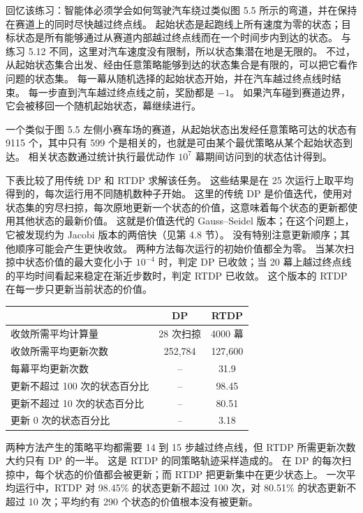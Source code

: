 \documentclass[UTF8,12pt,a4paper,fontset=fandol]{ctexart}
\begin{document}
回忆该练习：智能体必须学会如何驾驶汽车绕过类似图 5.5 所示的弯道，并在保持在赛道上的同时尽快越过终点线。
起始状态是起跑线上所有速度为零的状态；目标状态是所有能够通过从赛道内部越过终点线而在一个时间步内到达的状态。
与练习 5.12 不同，这里对汽车速度没有限制，所以状态集潜在地是无限的。
不过，从起始状态集合出发、经由任意策略能够到达的状态集合是有限的，可以把它看作问题的状态集。
每一幕从随机选择的起始状态开始，并在汽车越过终点线时结束。
每一步直到汽车越过终点线之前，奖励都是 $-1$。
如果汽车碰到赛道边界，它会被移回一个随机起始状态，幕继续进行。

一个类似于图 5.5 左侧小赛车场的赛道，从起始状态出发经任意策略可达的状态有 9115 个，其中只有 599 个是相关的，也就是可由某个最优策略从某个起始状态到达。
相关状态数通过统计执行最优动作 $10^7$ 幕期间访问到的状态估计得到。

下表比较了用传统 DP 和 RTDP 求解该任务。
这些结果是在 25 次运行上取平均得到的，每次运行用不同随机数种子开始。
这里的传统 DP 是价值迭代，使用对状态集的穷尽扫掠，每次原地更新一个状态的价值，这意味着每个状态的更新都使用其他状态的最新价值。
这就是价值迭代的 Gauss--Seidel 版本；在这个问题上，它被发现约为 Jacobi 版本的两倍快（见第 4.8 节）。
没有特别注意更新顺序；其他顺序可能会产生更快收敛。
两种方法每次运行的初始价值都全为零。
当某次扫掠中状态价值的最大变化小于 $10^{-4}$ 时，判定 DP 已收敛；当 20 幕上越过终点线的平均时间看起来稳定在渐近步数时，判定 RTDP 已收敛。
这个版本的 RTDP 在每一步只更新当前状态的价值。

\begin{center}
\begin{tabular}{lcc}
\toprule
 & DP & RTDP \\
\midrule
收敛所需平均计算量 & 28 次扫掠 & 4000 幕 \\
收敛所需平均更新次数 & 252,784 & 127,600 \\
每幕平均更新次数 & -- & 31.9 \\
更新不超过 100 次的状态百分比 & -- & 98.45 \\
更新不超过 10 次的状态百分比 & -- & 80.51 \\
更新 0 次的状态百分比 & -- & 3.18 \\
\bottomrule
\end{tabular}
\end{center}

两种方法产生的策略平均都需要 14 到 15 步越过终点线，但 RTDP 所需更新次数大约只有 DP 的一半。
这是 RTDP 的同策略轨迹采样造成的。
在 DP 的每次扫掠中，每个状态的价值都会被更新；而 RTDP 把更新集中在更少状态上。
一次平均运行中，RTDP 对 98.45\% 的状态更新不超过 100 次，对 80.51\% 的状态更新不超过 10 次；平均约有 290 个状态的价值根本没有被更新。
\end{document}

